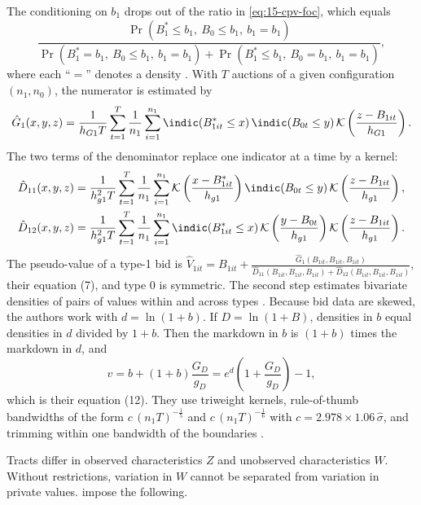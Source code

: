  The conditioning on $b_1$ drops out of the ratio in \eqref{eq:15-cpv-foc}, which equals
\begin{equation}\label{eq:15-cpv-ratio}
  \frac{\Pr(B_1^\ast\le b_1,\ B_0\le b_1,\ b_1=b_1)}
  {\Pr(B_1^\ast=b_1,\ B_0\le b_1,\ b_1=b_1)+\Pr(B_1^\ast\le b_1,\ B_0=b_1,\ b_1=b_1)},
\end{equation}
where each ``$=$'' denotes a density \citep[eq.~(6)]{CampoPerrigneVuong2003}. With $T$ auctions of a given
configuration $(n_1,n_0)$, the numerator is estimated by
\begin{equation*}
  \hat G_1(x,y,z)=\frac{1}{h_{G1}T}\sum_{t=1}^{T}\frac{1}{n_1}\sum_{i=1}^{n_1}
  \indic(B_{1it}^\ast\le x)\,\indic(B_{0t}\le y)\,\mathcal K\left(\frac{z-B_{1it}}{h_{G1}}\right).
\end{equation*}
The two terms of the denominator replace one indicator at a time by a kernel:
\begin{align*}
  \hat D_{11}(x,y,z)&=\frac{1}{h_{g1}^2T}\sum_{t=1}^{T}\frac{1}{n_1}\sum_{i=1}^{n_1}
  \mathcal K\left(\frac{x-B_{1it}^\ast}{h_{g1}}\right)\indic(B_{0t}\le y)\,\mathcal K\left(\frac{z-B_{1it}}{h_{g1}}\right),\\
  \hat D_{12}(x,y,z)&=\frac{1}{h_{g1}^2T}\sum_{t=1}^{T}\frac{1}{n_1}\sum_{i=1}^{n_1}
  \indic(B_{1it}^\ast\le x)\,\mathcal K\left(\frac{y-B_{0t}}{h_{g1}}\right)\mathcal K\left(\frac{z-B_{1it}}{h_{g1}}\right).
\end{align*}
The pseudo-value of a type-1 bid is
$\hat V_{1it}=B_{1it}+\frac{\hat G_1(B_{1it},B_{1it},B_{1it})}{\hat D_{11}(B_{1it},B_{1it},B_{1it})+\hat
D_{12}(B_{1it},B_{1it},B_{1it})}$, their equation (7), and type 0 is symmetric. The second step estimates
bivariate densities of pairs of values within and across types \citep[eqs.~(9)--(11)]{CampoPerrigneVuong2003}.
Because bid data are skewed, the authors work with $d=\ln(1+b)$. If $D=\ln(1+B)$, densities in $b$ equal
densities in $d$ divided by $1+b$. Then the markdown in $b$ is $(1+b)$ times the markdown in $d$, and
\begin{equation*}
  v=b+(1+b)\frac{G_D}{g_D}=e^{d}\left(1+\frac{G_D}{g_D}\right)-1,
\end{equation*}
which is their equation (12). They use triweight kernels, rule-of-thumb bandwidths of the form
$c\,(n_1T)^{-\frac15}$ and $c\,(n_1T)^{-\frac16}$ with $c=2.978\times1.06\,\hat\sigma$, and trimming within one
bandwidth of the boundaries \citep[pp.~188--189]{CampoPerrigneVuong2003}.

 Tracts differ in observed characteristics $Z$ and unobserved
characteristics $W$. Without restrictions, variation in $W$ cannot be separated from variation in private
values. \citet[Section~3.2]{CampoPerrigneVuong2003} impose the following.

